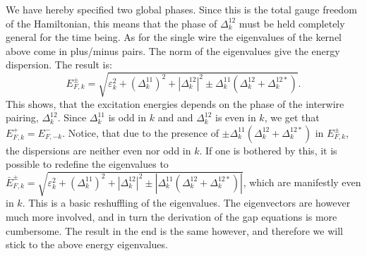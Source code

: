 We have hereby specified two global phases. Since this is the total gauge freedom of the Hamiltonian, this means that the phase of $\Delta^{12}_k$ must be held completely general for the time being. As for the single wire the eigenvalues of the kernel above come in plus/minus pairs. The norm of the eigenvalues give the energy dispersion. The result is:
\begin{equation}
E^{\pm}_{F,k} = \sqrt{\varepsilon^2_k + \left(\Delta^{11}_k\right)^2 + \left|\Delta^{12}_k\right|^2 \pm \Delta^{11}_k(\Delta^{12}_k + \Delta^{12*}_k)}. 
\end{equation} 
This shows, that the excitation energies depends on the phase of the interwire pairing, $\Delta^{12}_k$. Since $\Delta^{11}_k$ is odd in $k$ and and $\Delta^{12}_k$ is even in $k$, we get that $E^{+}_{F,k} = E^{-}_{F,-k}$. Notice, that due to the presence of $\pm \Delta^{11}_k(\Delta^{12}_k + \Delta^{12*}_k)$ in $E^{\pm}_{F,k}$, the dispersions are neither even nor odd in $k$. If one is bothered by this, it is possible to redefine the eigenvalues to $\bar{E}^{\pm}_{F,k} = \sqrt{\varepsilon^2_k + \left(\Delta^{11}_k\right)^2 + \left|\Delta^{12}_k\right|^2 \pm |\Delta^{11}_k(\Delta^{12}_k + \Delta^{12*}_k)|}$, which are manifestly even in $k$. This is a basic reshuffling of the eigenvalues. The eigenvectors are however much more involved, and in turn the derivation of the gap equations is more cumbersome. The result in the end is the same however, and therefore we will stick to the above energy eigenvalues.  

